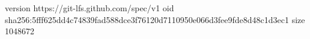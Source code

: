 version https://git-lfs.github.com/spec/v1
oid sha256:5fff625dd4c74839fad588dce3f76120d7110950e066d3fee9fde8d48c1d3ec1
size 1048672

